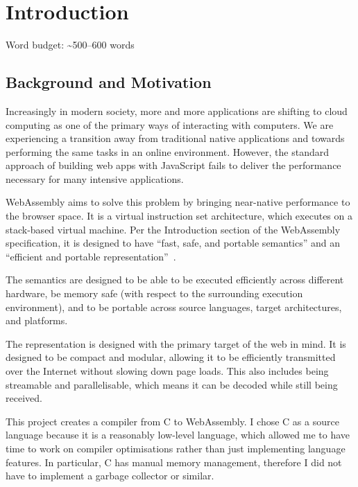 \documentclass[00-main.tex]{subfiles}
\begin{document}
\chapter{Introduction}

\begin{mrwComment}
Word budget: \textasciitilde500--600 words
\end{mrwComment}

\section{Background and Motivation}

Increasingly in modern society, more and more applications are shifting to cloud computing as one of the primary ways of interacting with computers.
We are experiencing a transition away from traditional native applications and towards performing the same tasks in an online environment.
However, the standard approach of building web apps with JavaScript fails to deliver the performance necessary for many intensive applications.

WebAssembly aims to solve this problem by bringing near-native performance to the browser space.
It is a virtual instruction set architecture, which executes on a stack-based virtual machine.
Per the Introduction section of the WebAssembly specification, it is designed to have ``fast, safe, and portable semantics'' and an ``efficient and portable representation''~.

The semantics are designed to be able to be executed efficiently across different hardware, be memory safe (with respect to the surrounding execution environment), and to be portable across source languages, target architectures, and platforms.

The representation is designed with the primary target of the web in mind.
It is designed to be compact and modular, allowing it to be efficiently transmitted over the Internet without slowing down page loads.
This also includes being streamable and parallelisable, which means it can be decoded while still being received.

This project creates a compiler from C to WebAssembly.
I chose C as a source language because it is a reasonably low-level language, which allowed me to have time to work on compiler optimisations rather than just implementing language features.
In particular, C has manual memory management, therefore I did not have to implement a garbage collector or similar.
\end{document}
